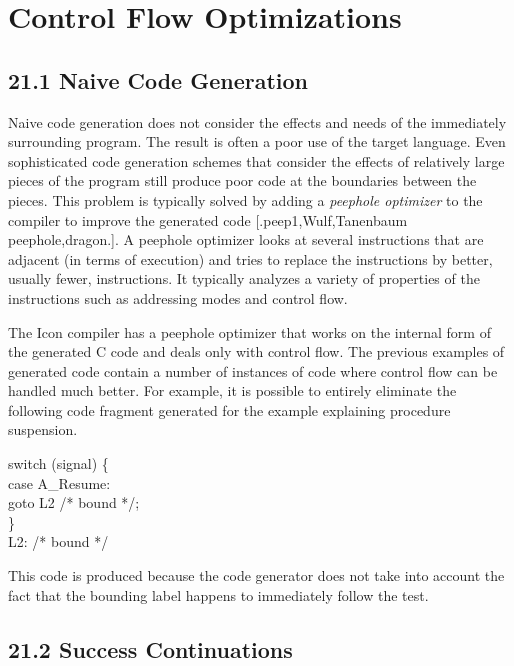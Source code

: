 \chapter{Control Flow Optimizations}

\section[21.1 Naive Code Generation]{21.1 Naive Code Generation}

Naive code generation does not consider the effects and needs of the
immediately surrounding program. The result is often a poor use of the
target language. Even sophisticated code generation schemes that
consider the effects of relatively large pieces of the program still
produce poor code at the boundaries between the pieces. This problem
is typically solved by adding a \textit{peephole optimizer} to the
compiler to improve the generated code [.peep1,Wulf,Tanenbaum
peephole,dragon.]. A peephole optimizer looks at several instructions
that are adjacent (in terms of execution) and tries to replace the
instructions by better, usually fewer, instructions. It typically
analyzes a variety of properties of the instructions such as
addressing modes and control flow.

The Icon compiler has a peephole optimizer that works on the internal
form of the generated C code and deals only with control flow. The
previous examples of generated code contain a number of instances of
code where control flow can be handled much better. For example, it is
possible to entirely eliminate the following code fragment generated
for the example explaining procedure suspension.

\goodbreak
\begin{iconcode}
\>switch (signal) \{\\
\>\>case A\_Resume:\\
\>\>\>goto L2 /* bound */;\\
\>\}\\
L2: /* bound */\\
\end{iconcode}

\noindent
This code is produced because the code generator does not take into
account the fact that the bounding label happens to immediately follow
the test.


\section[21.2 Success Continuations]{21.2 Success Continuations}

